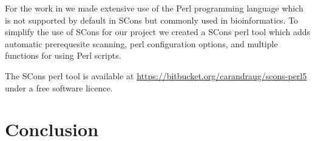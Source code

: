
For the work in  we made extensive use of
the Perl programming language which is not supported by default in
SCons but commonly used in bioinformatics.
To simplify the use of SCons for our project we created
a SCons perl tool which adds automatic prerequesite
scanning, perl configuration options, and multiple functions for using
Perl scripts.

The SCons perl tool is available at
\url{https://bitbucket.org/carandraug/scons-perl5} under a free
software licence.


\section{Conclusion}

